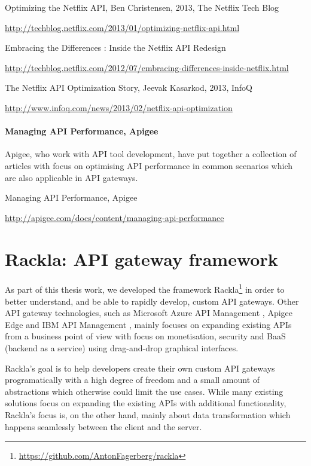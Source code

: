\documentclass{cslthse-msc}
\begin{document}
\vspace{5mm}

\noindent Optimizing the Netflix API, Ben Christensen, 2013, The Netflix Tech Blog

\noindent \url{http://techblog.netflix.com/2013/01/optimizing-netflix-api.html}

\vspace{5mm}

\noindent  Embracing the Differences : Inside the Netflix API Redesign

\noindent \url{http://techblog.netflix.com/2012/07/embracing-differences-inside-netflix.html}

\vspace{5mm}

\noindent The Netflix API Optimization Story, Jeevak Kasarkod, 2013, InfoQ

\noindent \url{http://www.infoq.com/news/2013/02/netflix-api-optimization}


\subsubsection{Managing API Performance, Apigee}
Apigee, who work with API tool development, have put together a collection of articles with focus on optimising API performance in common scenarios which are also applicable in API gateways.

\vspace{5mm}

\noindent Managing API Performance, Apigee

\noindent \url{http://apigee.com/docs/content/managing-api-performance}

\chapter{Rackla: API gateway framework}

As part of this thesis work, we developed the framework Rackla\footnote{\url{https://github.com/AntonFagerberg/rackla}} in order to better understand, and be able to rapidly develop, custom API gateways. Other API gateway technologies, such as Microsoft Azure API Management \cite{azure_api_management}, Apigee Edge \cite{apigee_edge} and IBM API Management \cite{ibm_api_management}, mainly focuses on expanding existing APIs from a business point of view with focus on monetisation, security and BaaS (backend as a service) using drag-and-drop graphical interfaces. 

Rackla's goal is to help developers create their own custom API gateways programatically with a high degree of freedom and a small amount of abstractions which otherwise could limit the use cases. While many existing solutions focus on expanding the existing APIs with additional functionality, Rackla's focus is, on the other hand, mainly about data transformation which happens seamlessly between the client and the server.
\end{document}
